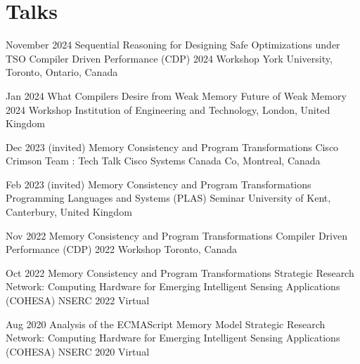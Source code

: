 \section{Talks}

    \cventry
        {November 2024}
        {Sequential Reasoning for Designing Safe Optimizations under TSO}
        {Compiler Driven Performance (CDP) 2024 Workshop}
        {York University, Toronto, Ontario, Canada}
        {}
        {}


    \cventry
        {Jan 2024}
        {What Compilers Desire from Weak Memory}
        {Future of Weak Memory 2024 Workshop}
        {Institution of Engineering and Technology, London, United Kingdom}
        {}
        {}


    \cventry
        {Dec 2023 (invited)}
        {Memory Consistency and Program Transformations}
        {Cisco Crimson Team : Tech Talk}
        {Cisco Systems Canada Co, Montreal, Canada}
        {}
        {}


    \cventry
        {Feb 2023 (invited)}
        {Memory Consistency and Program Transformations}
        {Programming Languages and Systems (PLAS) Seminar}
        {University of Kent, Canterbury, United Kingdom}
        {}
        {}

    \cventry
        {Nov 2022}
        {Memory Consistency and Program Transformations}
        {Compiler Driven Performance (CDP) 2022 Workshop}
        {Toronto, Canada}
        {}
        {}

    \cventry
        {Oct 2022}
        {Memory Consistency and Program Transformations}
        {Strategic Research Network: Computing Hardware for Emerging Intelligent Sensing Applications (COHESA) NSERC 2022}
        {Virtual}
        {}
        {}

    \cventry
        {Aug 2020}
        {Analysis of the ECMAScript Memory Model}
        {Strategic Research Network: Computing Hardware for Emerging Intelligent Sensing Applications (COHESA) NSERC 2020}
        {Virtual}
        {}
        {}
